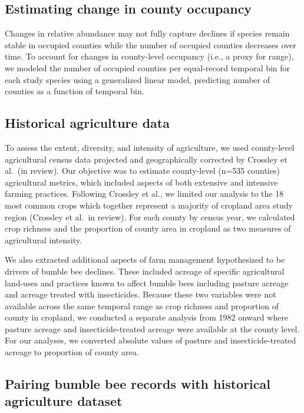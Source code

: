 \documentclass[11pt,]{article}
\begin{document}
\hypertarget{estimating-change-in-county-occupancy}{%
\subsection{Estimating change in county
occupancy}\label{estimating-change-in-county-occupancy}}

Changes in relative abundance may not fully capture declines if species
remain stable in occupied counties while the number of occupied counties
decreases over time. To account for changes in county-level occupancy
(i.e., a proxy for range), we modeled the number of occupied counties
per equal-record temporal bin for each study species using a generalized
linear model, predicting number of counties as a function of temporal
bin.

\hypertarget{historical-agriculture-data}{%
\subsection{Historical agriculture
data}\label{historical-agriculture-data}}

To assess the extent, diversity, and intensity of agriculture, we used
county-level agricultural census data projected and geographically
corrected by Crossley et al.~(in review). Our objective was to estimate
county-level (n=535 counties) agricultural metrics, which included
aspects of both extensive and intensive farming practices. Following
Crossley et al., we limited our analysis to the 18 most common crops
which together represent a majority of cropland area study region
(Crossley et al.~in review). For each county by census year, we
calculated crop richness and the proportion of county area in cropland
as two measures of agricultural intensity.

We also extracted additional aspects of farm management hypothesized to
be drivers of bumble bee declines. These included acreage of specific
agricultural land-uses and practices known to affect bumble bees
including pasture acreage and acreage treated with insecticides. Because
these two variables were not available across the same temporal range as
crop richness and proportion of county in cropland, we conducted a
separate analysis from 1982 onward where pasture acreage and
insecticide-treated acreage were available at the county level. For our
analyses, we converted absolute values of pasture and
insecticide-treated acreage to proportion of county area.

\hypertarget{pairing-bumble-bee-records-with-historical-agriculture-dataset}{%
\subsection{Pairing bumble bee records with historical agriculture
dataset}\label{pairing-bumble-bee-records-with-historical-agriculture-dataset}}
\end{document}
